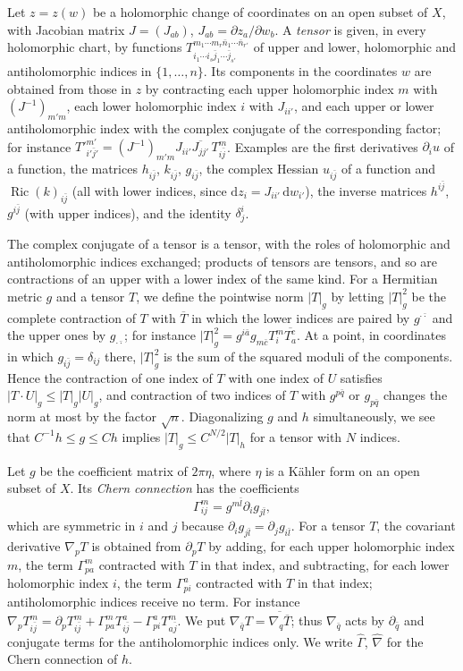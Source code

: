 Let $z=z(w)$ be a holomorphic change of coordinates on an open subset of $X$, with Jacobian matrix $J=(J_{ab})$, $J_{ab}=\partial z_a/\partial w_b$. A \emph{tensor} is given, in every holomorphic chart, by functions $T^{m_1\cdots m_r\bar n_1\cdots\bar n_{r'}}_{i_1\cdots i_s\bar j_1\cdots\bar j_{s'}}$ of upper and lower, holomorphic and antiholomorphic indices in $\{1,\ldots,n\}$. Its components in the coordinates $w$ are obtained from those in $z$ by contracting each upper holomorphic index $m$ with $(J^{-1})_{m'm}$, each lower holomorphic index $i$ with $J_{ii'}$, and each upper or lower antiholomorphic index with the complex conjugate of the corresponding factor; for instance $T'^{m'}_{i'\bar j'}=(J^{-1})_{m'm}J_{ii'}\overline{J_{jj'}}\,T^m_{i\bar j}$. Examples are the first derivatives $\partial_iu$ of a function, the matrices $h_{i\bar j}$, $k_{i\bar j}$, $g_{i\bar j}$, the complex Hessian $u_{i\bar j}$ of a function and $\operatorname{Ric}(k)_{i\bar j}$ (all with lower indices, since $\mathrm dz_i=J_{ii'}\,\mathrm dw_{i'}$), the inverse matrices $h^{i\bar j}$, $g^{i\bar j}$ (with upper indices), and the identity $\delta^i_j$.

The complex conjugate of a tensor is a tensor, with the roles of holomorphic and antiholomorphic indices exchanged; products of tensors are tensors, and so are contractions of an upper with a lower index of the same kind. For a Hermitian metric $g$ and a tensor $T$, we define the pointwise norm $|T|_g$ by letting $|T|_g^2$ be the complete contraction of $T$ with $\overline T$ in which the lower indices are paired by $g^{\cdot\bar\cdot}$ and the upper ones by $g_{\cdot\bar\cdot}$; for instance $|T|_g^2=g^{i\bar a}g_{m\bar c}T^m_i\overline{T^c_a}$. At a point, in coordinates in which $g_{i\bar j}=\delta_{ij}$ there, $|T|_g^2$ is the sum of the squared moduli of the components. Hence the contraction of one index of $T$ with one index of $U$ satisfies $|T\cdot U|_g\leq|T|_g|U|_g$, and contraction of two indices of $T$ with $g^{p\bar q}$ or $g_{p\bar q}$ changes the norm at most by the factor $\sqrt n$. Diagonalizing $g$ and $h$ simultaneously, we see that $C^{-1}h\leq g\leq Ch$ implies $|T|_g\leq C^{N/2}|T|_h$ for a tensor with $N$ indices.

Let $g$ be the coefficient matrix of $2\pi\eta$, where $\eta$ is a K\"ahler form on an open subset of $X$. Its \emph{Chern connection} has the coefficients
\[
 \Gamma^m_{ij}=g^{m\bar l}\partial_ig_{j\bar l},
\]
which are symmetric in $i$ and $j$ because $\partial_ig_{j\bar l}=\partial_jg_{i\bar l}$. For a tensor $T$, the covariant derivative $\nabla_pT$ is obtained from $\partial_pT$ by adding, for each upper holomorphic index $m$, the term $\Gamma^m_{pa}$ contracted with $T$ in that index, and subtracting, for each lower holomorphic index $i$, the term $\Gamma^a_{pi}$ contracted with $T$ in that index; antiholomorphic indices receive no term. For instance $\nabla_pT^m_{i\bar j}=\partial_pT^m_{i\bar j}+\Gamma^m_{pa}T^a_{i\bar j}-\Gamma^a_{pi}T^m_{a\bar j}$. We put $\nabla_{\bar q}T=\overline{\nabla_q\overline T}$; thus $\nabla_{\bar q}$ acts by $\partial_{\bar q}$ and conjugate terms for the antiholomorphic indices only. We write $\widehat\Gamma$, $\widehat\nabla$ for the Chern connection of $h$.

